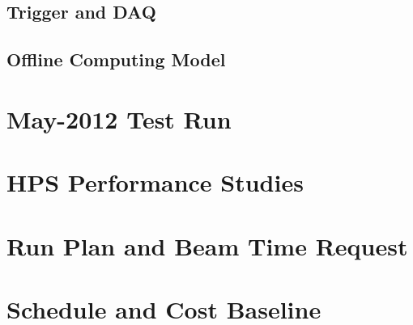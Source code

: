 \documentclass[prc,12pt,nofootinbib]{revtex4}
\begin{document}
\maketitle
\clearpage

\tableofcontents
\clearpage






\clearpage





\clearpage






\clearpage


\clearpage


\clearpage


\clearpage


\subsection{Trigger and DAQ }


\subsection{Offline Computing Model}


\section{May-2012 Test Run}
\label{sec:testrun2012}

\clearpage

\section{HPS Performance Studies}
\label{sec:performance}


\clearpage




\section{Run Plan and Beam Time Request}


\section{Schedule and Cost Baseline}



\clearpage



\clearpage


\end{document}
